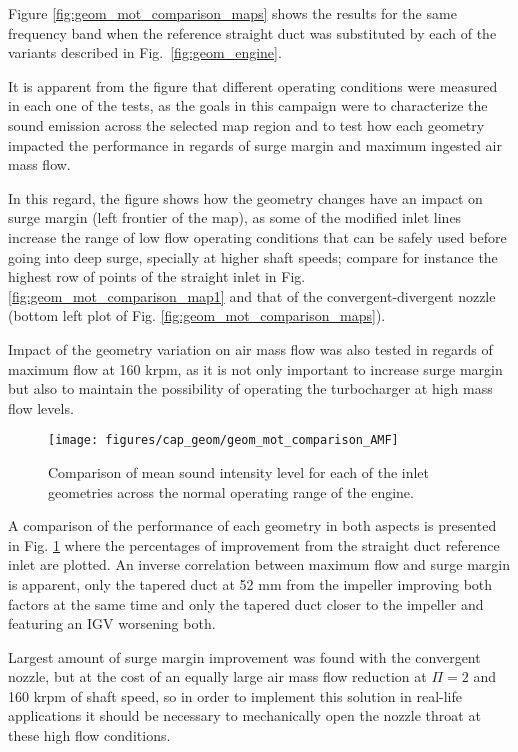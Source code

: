 Figure \ref{fig:geom_mot_comparison_maps} shows the results for the same frequency band when the reference straight duct was substituted by each of the variants described in Fig.~\ref{fig:geom_engine}. 

It is apparent from the figure that different operating conditions were measured in each one of the tests, as the goals in this campaign were to characterize the sound emission across the selected map region and to test how each geometry impacted the performance in regards of surge margin and maximum ingested air mass flow.

In this regard, the figure shows how the geometry changes have an impact on surge margin (left frontier of the map), as some of the modified inlet lines increase the range of low flow operating conditions that can be safely used before going into deep surge, specially at higher shaft speeds; compare for instance the highest row of points of the straight inlet in Fig. \ref{fig:geom_mot_comparison_map1} and that of the convergent-divergent nozzle (bottom left plot of Fig. \ref{fig:geom_mot_comparison_maps}).

Impact of the geometry variation on air mass flow was also tested in regards of maximum flow at 160 krpm, as it is not only important to increase surge margin but also to maintain the possibility of operating the turbocharger at high mass flow levels. 

\begin{figure}[t!]
\centering
\texttt{[image: figures/cap\_geom/geom\_mot\_comparison\_AMF]}
\caption{Comparison of mean sound intensity level for each of the inlet geometries across the normal operating range of the engine.}
\label{fig:geom_mot_comparison_AMF}
\end{figure}

A comparison of the performance of each geometry in both aspects is presented in Fig. \ref{fig:geom_mot_comparison_AMF} where the percentages of improvement from the straight duct reference inlet are plotted. An inverse correlation between maximum flow and surge margin is apparent, only the tapered duct at 52 mm from the impeller improving both factors at the same time and only the tapered duct closer to the impeller and featuring an IGV worsening both.

Largest amount of surge margin improvement was found with the convergent nozzle, but at the cost of an equally large air mass flow reduction at $\Pi = 2$ and 160 krpm of shaft speed, so in order to implement this solution in real-life applications it should be necessary to mechanically open the nozzle throat at these high flow conditions.

